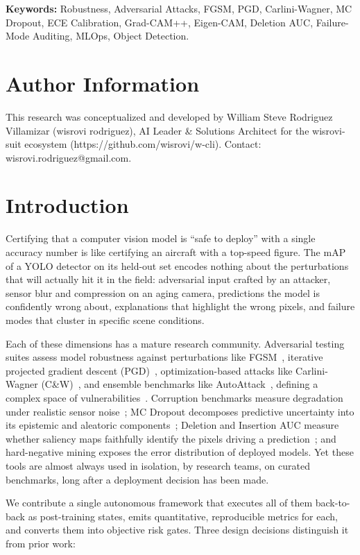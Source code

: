 \documentclass[10pt,twocolumn,letterpaper]{article}
\begin{document}
\textbf{Keywords:} Robustness, Adversarial Attacks, FGSM, PGD, Carlini-Wagner, MC Dropout, ECE Calibration, Grad-CAM++, Eigen-CAM, Deletion AUC, Failure-Mode Auditing, MLOps, Object Detection.


\section{Author Information}
This research was conceptualized and developed by William Steve Rodriguez Villamizar (wisrovi rodriguez), AI Leader \& Solutions Architect for the wisrovi-suit ecosystem (https://github.com/wisrovi/w-cli). Contact: wisrovi.rodriguez@gmail.com.

\section{Introduction}
Certifying that a computer vision model is ``safe to deploy'' with a single accuracy number is like certifying an aircraft with a top-speed figure. The mAP of a YOLO detector on its held-out set encodes nothing about the perturbations that will actually hit it in the field: adversarial input crafted by an attacker, sensor blur and compression on an aging camera, predictions the model is confidently wrong about, explanations that highlight the wrong pixels, and failure modes that cluster in specific scene conditions.

Each of these dimensions has a mature research community. Adversarial testing suites assess model robustness against perturbations like FGSM~\cite{goodfellow2015fgsm}, iterative projected gradient descent (PGD)~\cite{madry2018towards}, optimization-based attacks like Carlini-Wagner (C\&W)~\cite{carlini2017towards}, and ensemble benchmarks like AutoAttack~\cite{croce2020reliable}, defining a complex space of vulnerabilities~\cite{silva2020opportunities}. Corruption benchmarks measure degradation under realistic sensor noise~\cite{hendrycks2019benchmarking}; MC Dropout decomposes predictive uncertainty into its epistemic and aleatoric components~\cite{gal2016dropout,kendall2017uncertainties}; Deletion and Insertion AUC measure whether saliency maps faithfully identify the pixels driving a prediction~\cite{petsiuk2018rise,chattopadhay2018gradcam,selvaraju2017grad}; and hard-negative mining exposes the error distribution of deployed models. Yet these tools are almost always used in isolation, by research teams, on curated benchmarks, long after a deployment decision has been made.

We contribute a single autonomous framework that executes all of them back-to-back as post-training states, emits quantitative, reproducible metrics for each, and converts them into objective risk gates. Three design decisions distinguish it from prior work:
\end{document}
